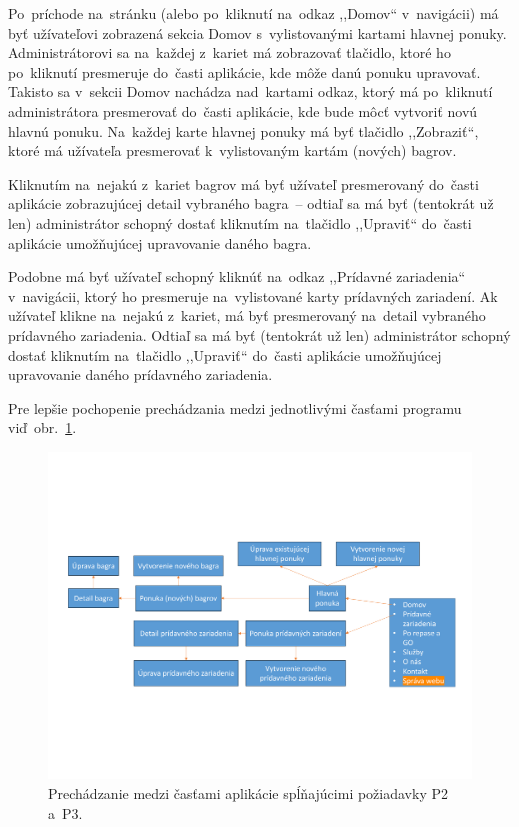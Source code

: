 Po~príchode na~stránku (alebo po~kliknutí na~odkaz ,,Domov`` v~navigácii) má byť užívateľovi zobrazená sekcia Domov s~vylistovanými kartami hlavnej ponuky. Administrátorovi sa na~každej z~kariet má zobrazovať tlačidlo, ktoré ho po~kliknutí presmeruje do~časti aplikácie, kde môže danú ponuku upravovať. Takisto sa v~sekcii Domov nachádza nad~kartami odkaz, ktorý má po~kliknutí administrátora presmerovať do~časti aplikácie, kde bude môcť vytvoriť novú hlavnú ponuku. Na~každej karte hlavnej ponuky má byť tlačidlo ,,Zobraziť``, ktoré má užívateľa presmerovať k~vylistovaným kartám (nových) bagrov. 

Kliknutím na~nejakú z~kariet bagrov má byť užívateľ presmerovaný do~časti aplikácie zobrazujúcej detail vybraného bagra~-- odtiaľ sa má byť (tentokrát už len) administrátor schopný dostať kliknutím na~tlačidlo ,,Upraviť`` do~časti aplikácie umožňujúcej upravovanie daného bagra.

Podobne má byť užívateľ schopný kliknúť na~odkaz ,,Prídavné zariadenia`` v~navigácii, ktorý ho presmeruje na~vylistované karty prídavných zariadení. Ak užívateľ klikne na~nejakú z~kariet, má byť presmerovaný na~detail vybraného prídavného zariadenia. Odtiaľ sa má byť (tentokrát už len) administrátor schopný dostať kliknutím na~tlačidlo ,,Upraviť`` do~časti aplikácie umožňujúcej upravovanie daného prídavného zariadenia.

Pre lepšie pochopenie prechádzania medzi jednotlivými časťami programu viď~obr.~\ref{p2 p3 graph}.

\begin{figure}[H]\centering
\includegraphics[width=140mm]{../img/UI concept/p2 p3 graph}
\caption{Prechádzanie medzi časťami aplikácie spĺňajúcimi požiadavky P2 a~P3.}
\label{p2 p3 graph}
\end{figure}

